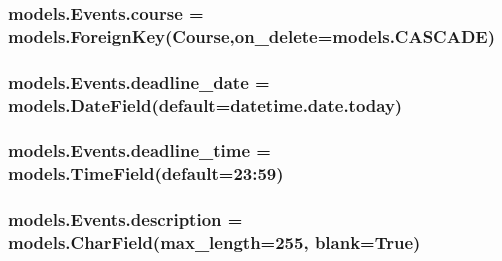 \subsubsection[{\texorpdfstring{course}{course}}]{\setlength{\rightskip}{0pt plus 5cm}models.\+Events.\+course = models.\+Foreign\+Key({\bf Course},on\+\_\+delete=models.\+C\+A\+S\+C\+A\+DE)\hspace{0.3cm}{\ttfamily [static]}}\hypertarget{classmodels_1_1_events_a5c90506df33c4428aaed6955ccc65797}{}\label{classmodels_1_1_events_a5c90506df33c4428aaed6955ccc65797}
\subsubsection[{\texorpdfstring{deadline\+\_\+date}{deadline_date}}]{\setlength{\rightskip}{0pt plus 5cm}models.\+Events.\+deadline\+\_\+date = models.\+Date\+Field(default=datetime.\+date.\+today)\hspace{0.3cm}{\ttfamily [static]}}\hypertarget{classmodels_1_1_events_a3c992db71af6338f28f5a80401ede6e4}{}\label{classmodels_1_1_events_a3c992db71af6338f28f5a80401ede6e4}
\subsubsection[{\texorpdfstring{deadline\+\_\+time}{deadline_time}}]{\setlength{\rightskip}{0pt plus 5cm}models.\+Events.\+deadline\+\_\+time = models.\+Time\+Field(default=\textquotesingle{}23\+:59\textquotesingle{})\hspace{0.3cm}{\ttfamily [static]}}\hypertarget{classmodels_1_1_events_a9a31387cf1b90bea105100b320a8b6ee}{}\label{classmodels_1_1_events_a9a31387cf1b90bea105100b320a8b6ee}
\subsubsection[{\texorpdfstring{description}{description}}]{\setlength{\rightskip}{0pt plus 5cm}models.\+Events.\+description = models.\+Char\+Field(max\+\_\+length=255, blank=True)\hspace{0.3cm}{\ttfamily [static]}}\hypertarget{classmodels_1_1_events_a3f6fb39bf32a2b2c71f3f753be62db2e}{}\label{classmodels_1_1_events_a3f6fb39bf32a2b2c71f3f753be62db2e}
